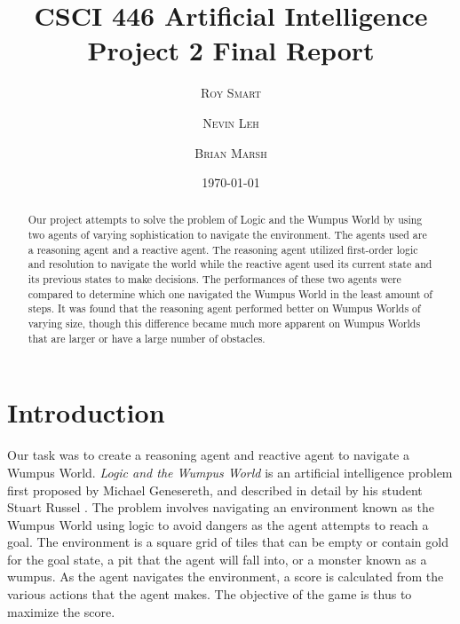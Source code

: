 \documentclass{article}
\title{\vspace{-15mm}\fontsize{24pt}{10pt}\selectfont\textbf{CSCI 446 Artificial Intelligence \\ Project 2 Final Report} \\[-2mm]} %
\date{\today}
\author{
\large
\textsc{Roy Smart} \and \textsc{Nevin Leh} \and \textsc{Brian Marsh}\\[2mm] %
}
\begin{document}
\maketitle %

\thispagestyle{fancy} %



\normalsize

\begin{abstract}
	Our project attempts to solve the problem of Logic and the Wumpus World by using two agents of varying sophistication to navigate the environment.
	 The agents used are a reasoning agent and a reactive agent. The reasoning agent utilized first-order logic and resolution to navigate the world while the reactive agent used its current state and its previous states to make decisions. The performances of these two agents were compared to determine which one navigated the Wumpus World in the least amount of steps. It was found that the reasoning agent performed better on Wumpus Worlds of varying size, though this difference became much more apparent on Wumpus Worlds that are larger or have a large number of obstacles.
\end{abstract}
\section{Introduction}
Our task was to create a reasoning agent and reactive agent to navigate a Wumpus World.
		\textit{Logic and the Wumpus World} is an artificial intelligence problem first proposed by Michael Genesereth, and described in detail by his student Stuart Russel \cite{ai}.  The problem involves navigating an environment known as the Wumpus World using logic to avoid dangers as the agent attempts to reach a goal.  The environment is a square grid of tiles that can be empty or contain gold for the goal state, a pit that the agent will fall into, or a monster known as a wumpus. 
		 As the agent navigates the environment, a score is calculated from the various actions that the agent makes.  
		 The objective of the game is thus to maximize the score.
		 
\end{document}

